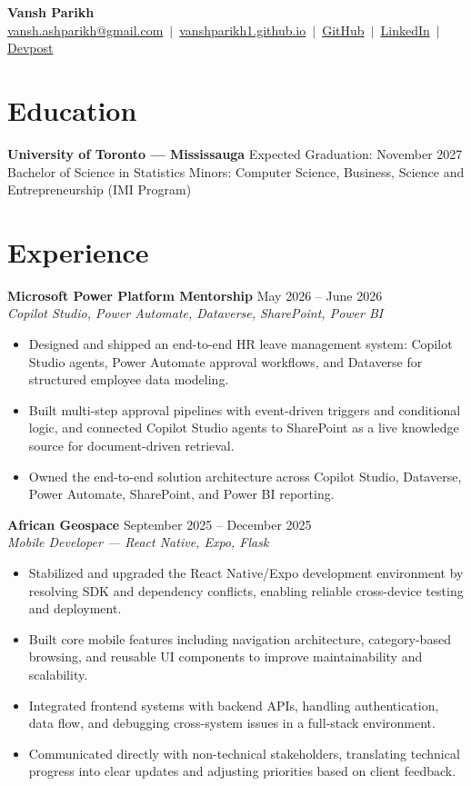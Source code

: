 \documentclass[10pt,letterpaper]{article}
\begin{document}
\begin{center}
    {\LARGE \textbf{Vansh Parikh}}\\[2pt]
    \href{mailto:vansh.ashparikh@gmail.com}{vansh.ashparikh@gmail.com} \,$|$\,
    \href{https://vanshparikh1.github.io}{vanshparikh1.github.io} \,$|$\,
    \href{https://github.com/VanshParikh1}{GitHub} \,$|$\,
    \href{https://www.linkedin.com/in/vanshparikh22/}{LinkedIn} \,$|$\,
    \href{https://devpost.com/VanshParikh1}{Devpost}
\end{center}
\section*{Education}
\textbf{University of Toronto — Mississauga} \hfill Expected Graduation: November 2027\\
Bachelor of Science in Statistics \quad Minors: Computer Science, Business, Science and Entrepreneurship (IMI Program)
\section*{Experience}
\textbf{Microsoft Power Platform Mentorship} \hfill May 2026 -- June 2026\\
\textit{Copilot Studio, Power Automate, Dataverse, SharePoint, Power BI}
\begin{itemize}
    \item Designed and shipped an end-to-end HR leave management system: Copilot Studio agents, Power Automate approval workflows, and Dataverse for structured employee data modeling.
    \item Built multi-step approval pipelines with event-driven triggers and conditional logic, and connected Copilot Studio agents to SharePoint as a live knowledge source for document-driven retrieval.
    \item Owned the end-to-end solution architecture across Copilot Studio, Dataverse, Power Automate, SharePoint, and Power BI reporting.
\end{itemize}
\textbf{African Geospace} \hfill September 2025 -- December 2025\\
\textit{Mobile Developer — React Native, Expo, Flask}
\begin{itemize}
    \item Stabilized and upgraded the React Native/Expo development environment by resolving SDK and dependency conflicts, enabling reliable cross-device testing and deployment.
    \item Built core mobile features including navigation architecture, category-based browsing, and reusable UI components to improve maintainability and scalability.
    \item Integrated frontend systems with backend APIs, handling authentication, data flow, and debugging cross-system issues in a full-stack environment.
    \item Communicated directly with non-technical stakeholders, translating technical progress into clear updates and adjusting priorities based on client feedback.
\end{itemize}
\end{document}
